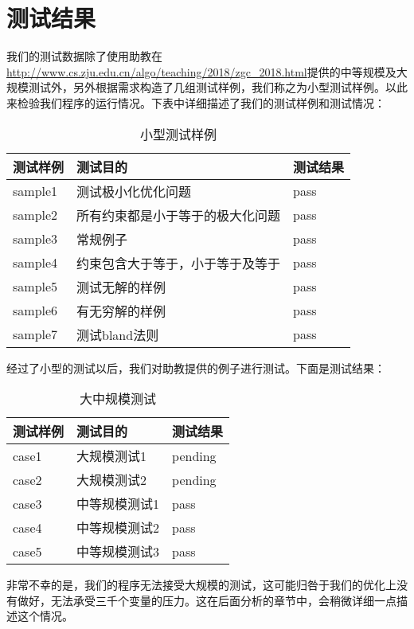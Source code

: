\chapter{测试结果}

我们的测试数据除了使用助教在\url{http://www.cs.zju.edu.cn/algo/teaching/2018/zgc\_2018.html}提供的中等规模及大规模测试外，另外根据需求构造了几组测试样例，我们称之为小型测试样例。以此来检验我们程序的运行情况。下表中详细描述了我们的测试样例和测试情况：


\begin{table}[h]
	\caption{小型测试样例}
	\centering
	\begin{tabular}{|l|l|l|}
		\hline
		测试样例 & 测试目的 & 测试结果 \\
		\hline
		sample1 & 测试极小化优化问题 & pass \\
		\hline
		sample2 & 所有约束都是小于等于的极大化问题 & pass \\
		\hline
		sample3 & 常规例子 & pass \\
		\hline
		sample4 & 约束包含大于等于，小于等于及等于 & pass \\
		\hline
		sample5 & 测试无解的样例 & pass \\
		\hline
		sample6 & 有无穷解的样例 & pass \\
		\hline
		sample7 & 测试bland法则 & pass \\
		\hline
	\end{tabular}
\end{table}

经过了小型的测试以后，我们对助教提供的例子进行测试。下面是测试结果：

\begin{table}[h]
	\caption{大中规模测试}
	\centering
	\begin{tabular}{|l|l|l|}
		\hline
		测试样例 & 测试目的 & 测试结果 \\
		\hline
		case1 & 大规模测试1 & pending \\
		\hline
		case2 & 大规模测试2 & pending \\
		\hline
		case3 & 中等规模测试1 & pass \\
		\hline
		case4 & 中等规模测试2 & pass \\
		\hline
		case5 & 中等规模测试3 & pass \\
		\hline
	\end{tabular}
\end{table}



非常不幸的是，我们的程序无法接受大规模的测试，这可能归咎于我们的优化上没有做好，无法承受三千个变量的压力。这在后面分析的章节中，会稍微详细一点描述这个情况。